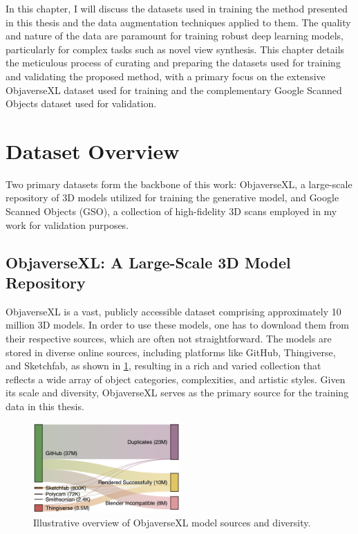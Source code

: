 \label{chapter:data-preparation}

In this chapter, I will discuss the datasets used in training the method presented in this thesis and the data augmentation techniques applied to them.
The quality and nature of the data are paramount for training robust deep learning models, particularly for complex tasks such as novel view synthesis. This chapter details the meticulous process of curating and preparing the datasets used for training and validating the proposed method, with a primary focus on the extensive ObjaverseXL dataset used for training and the complementary Google Scanned Objects dataset used for validation.

\section{Dataset Overview}\label{sec:dataset-overview}

Two primary datasets form the backbone of this work: ObjaverseXL, a large-scale repository of 3D models utilized for training the generative model, and Google Scanned Objects (GSO), a collection of high-fidelity 3D scans employed in my work for validation purposes.

\subsection{ObjaverseXL: A Large-Scale 3D Model Repository}\label{ssec:objaversexl-overview}
ObjaverseXL \cite{objaversexl} is a vast, publicly accessible dataset comprising approximately 10 million 3D models. In order to use these models, one has to download them from their respective sources, which are often not straightforward. The models are stored in diverse online sources, including platforms like GitHub, Thingiverse, and Sketchfab, as shown in \ref{fig:objaversexl-overview}, resulting in a rich and varied collection that reflects a wide array of object categories, complexities, and artistic styles. Given its scale and diversity, ObjaverseXL serves as the primary source for the training data in this thesis.

\begin{figure}[h]
  \centering
  \includegraphics[width=0.5\textwidth]{images/data/sankey-diagram-objaverse-sources.png}
  \caption{Illustrative overview of ObjaverseXL model sources and diversity.}
  \label{fig:objaversexl-overview}
\end{figure}

